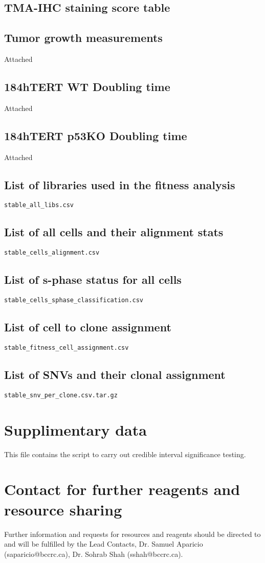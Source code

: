\documentclass{article}
\begin{document}
\subsection{TMA-IHC staining score table}
\subsection{Tumor growth measurements}
Attached
\subsection{184hTERT WT Doubling time}
Attached
\subsection{184hTERT p53KO Doubling time}
Attached
\subsection{List of libraries used in the fitness analysis}
\texttt{stable\_all\_libs.csv}
\subsection{List of all cells and their alignment stats}
\texttt{stable\_cells\_alignment.csv}
\subsection{List of s-phase status for all cells} \texttt{stable\_cells\_sphase\_classification.csv} 
\subsection{List of cell to clone assignment} \texttt{stable\_fitness\_cell\_assignment.csv}
\subsection{List of SNVs and their clonal assignment} \texttt{stable\_snv\_per\_clone.csv.tar.gz}

\section{Supplimentary data}
This file contains the script to carry out credible interval   significance testing.

\section{Contact for further reagents and resource sharing}
Further information and requests for resources and reagents should be directed to and will be fulfilled by the Lead Contacts,
Dr. Samuel Aparicio (saparicio@bccrc.ca), Dr. Sohrab Shah (sshah@bccrc.ca).
\end{document}
